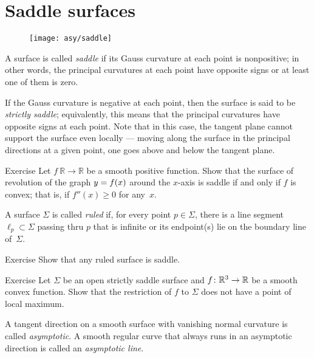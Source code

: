\section{Saddle surfaces}\label{sec:saddle}

\begin{wrapfigure}{r}{43 mm}
\vskip-8mm
\centering
\texttt{[image: asy/saddle]}
\vskip0mm
\end{wrapfigure}

A surface is called \emph{saddle} if its Gauss curvature at each point is nonpositive;
in other words, the principal curvatures at each point have opposite signs or at least one of them is zero.

If the Gauss curvature is negative at each point,
then the surface is said to be {}\emph{strictly saddle};
equivalently, this means that the principal curvatures have opposite signs at each point.
Note that in this case, the tangent plane cannot support the surface even locally --- moving along the surface in the principal directions at a given point, one goes above and below the tangent plane.  


\begin{thm}{Exercise}\label{ex:convex-revolution}
Let $f\:\mathbb{R}\to\mathbb{R}$ be a smooth positive function.
Show that the surface of revolution of the graph $y\z=f(x)$ around the $x$-axis
 is saddle if and only if $f$ is convex; that is, if $f''(x)\ge0$ for any~$x$.
\end{thm}

A surface $\Sigma$ is called \emph{ruled} if, for every point $p\in \Sigma$, there is a line segment $\ell_p\subset \Sigma$ passing thru $p$ that is infinite or its endpoint(s) lie on the boundary line of~$\Sigma$.

\begin{thm}{Exercise}\label{ex:ruled=>saddle}
Show that any ruled surface is saddle.
\end{thm}

\begin{thm}{Exercise}\label{ex:saddle-convex}
Let $\Sigma$ be an open strictly saddle surface and $f\:\mathbb{R}^3\z\to\mathbb{R}$ be a smooth convex function.
Show that the restriction of $f$ to $\Sigma$ does not have a point of local maximum.
\end{thm}

A tangent direction on a smooth surface with vanishing normal curvature is called \emph{asymptotic}.
A smooth regular curve that always runs in an asymptotic direction is called an
{}\emph{asymptotic line}.\label{page:asymptotic line}


